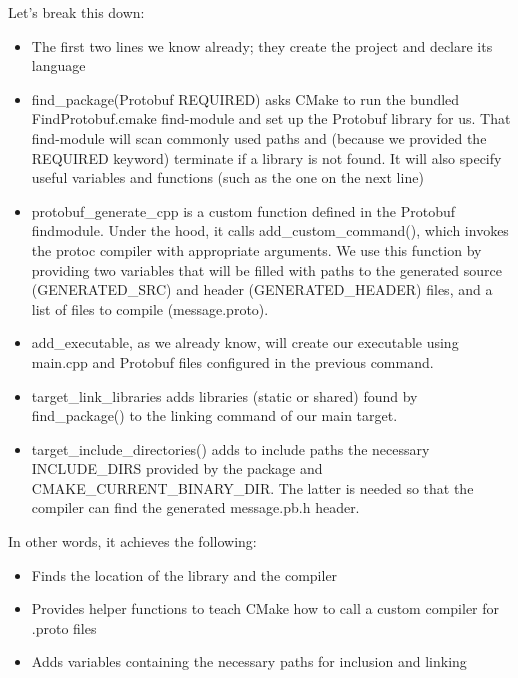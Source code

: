 Let's break this down:

\begin{itemize}
\item 
The first two lines we know already; they create the project and declare its language

\item 
find\_package(Protobuf REQUIRED) asks CMake to run the bundled FindProtobuf.cmake find-module and set up the Protobuf library for us. That find-module will scan commonly used paths and (because we provided the REQUIRED keyword) terminate if a library is not found. It will also specify useful variables and functions (such as the one on the next line)

\item 
protobuf\_generate\_cpp is a custom function defined in the Protobuf findmodule. Under the hood, it calls add\_custom\_command(), which invokes the protoc compiler with appropriate arguments. We use this function by providing two variables that will be filled with paths to the generated source (GENERATED\_SRC) and header (GENERATED\_HEADER) files, and a list of files to compile (message.proto).

\item 
add\_executable, as we already know, will create our executable using main.cpp and Protobuf files configured in the previous command.

\item 
target\_link\_libraries adds libraries (static or shared) found by find\_package() to the linking command of our main target.

\item 
target\_include\_directories() adds to include paths the necessary INCLUDE\_DIRS provided by the package and CMAKE\_CURRENT\_BINARY\_DIR. The latter is needed so that the compiler can find the generated message.pb.h header.
\end{itemize}

In other words, it achieves the following:

\begin{itemize}
\item 
Finds the location of the library and the compiler

\item 
Provides helper functions to teach CMake how to call a custom compiler for .proto files

\item 
Adds variables containing the necessary paths for inclusion and linking
\end{itemize}

